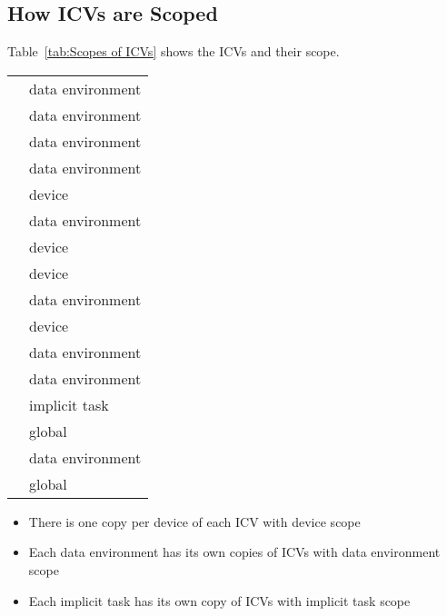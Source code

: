 \subsection{How ICVs are Scoped}
\label{subsec:How ICVs are Scoped}
Table~\ref{tab:Scopes of ICVs} shows the ICVs and their scope.
\renewcommand{\arraystretch}{1.3}
\tablelasttail{\hline}
\begin{supertabular}{p{1.5in} p{2.5in}}
 & data environment\\
 & data environment\\
 & data environment\\
 & data environment\\
 & device\\
 & data environment\\
 & device\\
 & device\\
 & data environment\\
 & device\\
 & data environment\\
 & data environment\\
 & implicit task\\
 & global\\
 & data environment\\
 & global\\
\end{supertabular}
\renewcommand{\arraystretch}{1.5} %

\descr
\begin{itemize}
\item There is one copy per device of each ICV with device scope

\item Each data environment has its own copies of ICVs with data environment scope

\item Each implicit task has its own copy of ICVs with implicit task scope 
\end{itemize}

